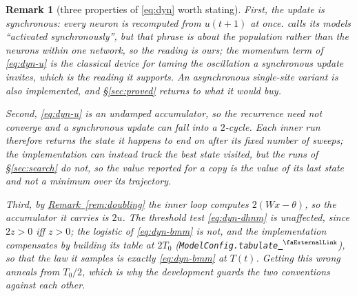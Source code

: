 \documentclass{easychair}
\newtheorem{remark}[thm]{Remark}
\newcommand{\secref}[1]{\hyperref[#1]{\textcolor{academicpurple}{\S\ref*{#1}}}}
\newcommand{\citeref}[1]{\textcolor{academicpurple}{\cite{#1}}}
\newcommand{\remref}[1]{\textcolor{academicpurple}{\hyperref[#1]{Remark~\ref*{#1}}}}
\newcommand{\extlink}{~\ensuremath{{}^\text{\faExternalLink}}}
\newcommand{\repoowner}{mkaratarakis/HNBM}
\newcommand{\reporef}{1bd91612ee31180f6c99fa11090b713f3012ead4}
\newcommand{\repo}{https://github.com/\repoowner/blob/\reporef}
\newcommand{\srcl}[2]{\href{\repo/#1\#L#2}{\extlink}}
\newcommand{\qusrc}[2]{\srcl{HopfieldNet/QUBO/#1}{#2}}
\begin{document}
\begin{remark}[three properties of \eqref{eq:dyn} worth stating]\label{rem:temperature}
First, the update is \emph{synchronous}: every neuron is recomputed from $u(t+1)$ at once.
\citeref{liwang2022} calls its models \enquote{activated synchronously}, but that phrase is about
the population rather than the neurons within one network, so the reading is ours; the momentum
term of \eqref{eq:dyn-u} is the classical device for taming the oscillation a synchronous update
invites, which is the reading it supports. An asynchronous single-site variant is also
implemented, and \secref{sec:proved} returns to what it would buy.

Second, \eqref{eq:dyn-u} is an \emph{undamped} accumulator, so the recurrence need not converge and
a synchronous update can fall into a $2$-cycle. Each inner run therefore returns the state it
happens to end on after its fixed number of sweeps; the implementation can instead track the best
state visited, but the runs of \secref{sec:search} do not, so the value reported for a copy is the
value of its last state and not a minimum over its trajectory.

Third, by \remref{rem:doubling} the inner loop computes $2(Wx - \theta)$, so the accumulator it
carries is $2u$. The threshold test \eqref{eq:dyn-dhnm} is unaffected, since $2z > 0$ iff $z > 0$;
the logistic of \eqref{eq:dyn-bmm} is not, and the implementation compensates by building its table
at $2T_0$ (\lstinline{ModelConfig.tabulate}\qusrc{Dynamics.lean}{169}), so that the law it samples is
exactly \eqref{eq:dyn-bmm} at $T(t)$. Getting this wrong anneals from $T_0/2$, which is why the
development guards the two conventions against each other.
\end{remark}
\end{document}
